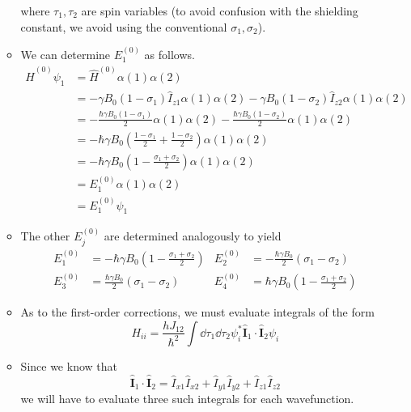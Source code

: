 \documentclass[../notes.tex]{subfiles}
\begin{document}
\begin{itemize}
\begin{itemize}
        where $\tau_1,\tau_2$ are spin variables (to avoid confusion with the shielding constant, we avoid using the conventional $\sigma_1,\sigma_2$).
        \item We can determine $E_1^{(0)}$ as follows.
        \begin{align*}
            \hat{H}^{(0)}\psi_1 &= \hat{H}^{(0)}\alpha(1)\alpha(2)\\
            &= -\gamma B_0(1-\sigma_1)\hat{I}_{z1}\alpha(1)\alpha(2)-\gamma B_0(1-\sigma_2)\hat{I}_{z2}\alpha(1)\alpha(2)\\
            &= -\frac{\hbar\gamma B_0(1-\sigma_1)}{2}\alpha(1)\alpha(2)-\frac{\hbar\gamma B_0(1-\sigma_2)}{2}\alpha(1)\alpha(2)\\
            &= -\hbar\gamma B_0\left( \frac{1-\sigma_1}{2}+\frac{1-\sigma_2}{2} \right)\alpha(1)\alpha(2)\\
            &= -\hbar\gamma B_0\left( 1-\frac{\sigma_1+\sigma_2}{2} \right)\alpha(1)\alpha(2)\\
            &= E_1^{(0)}\alpha(1)\alpha(2)\\
            &= E_1^{(0)}\psi_1
        \end{align*}
        \item The other $E_j^{(0)}$ are determined analogously to yield
        \begin{align*}
            E_1^{(0)} &= -\hbar\gamma B_0\left( 1-\frac{\sigma_1+\sigma_2}{2} \right)&
                E_2^{(0)} &= -\frac{\hbar\gamma B_0}{2}(\sigma_1-\sigma_2)\\
            E_3^{(0)} &= \frac{\hbar\gamma B_0}{2}(\sigma_1-\sigma_2)&
                E_4^{(0)} &= \hbar\gamma B_0\left( 1-\frac{\sigma_1+\sigma_2}{2} \right)
        \end{align*}
        \item As to the first-order corrections, we must evaluate integrals of the form
        \begin{equation*}
            H_{ii} = \frac{hJ_{12}}{\hbar^2}\int\dd{\tau_1}\dd{\tau_2}\psi_i^*\hat{\mathbf{I}}_1\cdot\hat{\mathbf{I}}_2\psi_i
        \end{equation*}
        \item Since we know that
        \begin{equation*}
            \hat{\mathbf{I}}_1\cdot\hat{\mathbf{I}}_2 = \hat{I}_{x1}\hat{I}_{x2}+\hat{I}_{y1}\hat{I}_{y2}+\hat{I}_{z1}\hat{I}_{z2}
        \end{equation*}
        we will have to evaluate three such integrals for each wavefunction.

\end{itemize}
\end{itemize}
\end{document}

